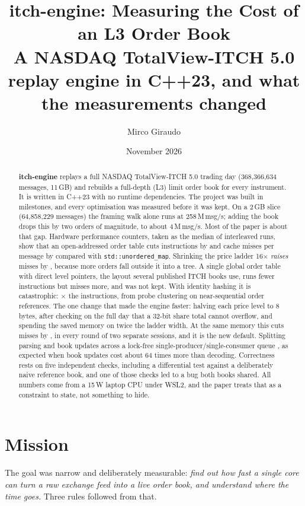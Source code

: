 \documentclass[10pt,a4paper]{article}
\title{\textbf{itch-engine}: Measuring the Cost of an L3 Order Book\\[2pt]
\large A NASDAQ TotalView-ITCH 5.0 replay engine in C++23, and what the measurements changed}
\author{Mirco Giraudo}
\date{November 2026}
\newcommand{\code}[1]{\texttt{#1}}
\begin{document}
\maketitle

\begin{abstract}
\noindent
\textbf{itch-engine} replays a full NASDAQ TotalView-ITCH 5.0 trading day (368{,}366{,}634 messages, 11\,GB)
and rebuilds a full-depth (L3) limit order book for every instrument. It is written in C++23 with no runtime dependencies.
The project was built in milestones, and every optimisation was measured before it was kept.
On a 2\,GB slice (64{,}858{,}229 messages) the framing walk alone runs at 258\,M\,msg/s;
adding the book drops this by two orders of magnitude, to about 4\,M\,msg/s. Most of the paper is about that gap.
Hardware performance counters, taken as the median of \CountersReps{} interleaved runs, show that an open-addressed order table cuts instructions by \PctTableInstr{} and
cache misses per message by \PctTableMiss{} compared with \code{std::unordered\_map}.
Shrinking the price ladder 16$\times$ \emph{raises} misses by \PctWidthMiss, because more orders fall outside it into a tree.
A single global order table with direct level pointers, the layout several published ITCH books use, runs fewer instructions
but misses more, and was not kept. With identity hashing it is catastrophic: \GidInstrX$\times$ the instructions, from probe clustering on near-sequential order references.
The one change that made the engine faster: halving each price level to 8 bytes, after checking on the full day that a 32-bit share total cannot overflow,
and spending the saved memory on twice the ladder width. At the same memory this cuts misses by \PctLevelWideMiss, in every round of two separate sessions, and it is the new default.
Splitting parsing and book updates across a lock-free single-producer/single-consumer queue
\MthreeVerdictShort, as expected when book updates cost about 64 times more than decoding.
Correctness rests on five independent checks, including a differential test against a deliberately naive reference
book, and one of those checks led to a bug both books shared.
All numbers come from a 15\,W laptop CPU under WSL2, and the paper treats that as a constraint to state, not something to hide.
\end{abstract}

\section{Mission}
The goal was narrow and deliberately measurable: \emph{find out how fast a single core can turn
a raw exchange feed into a live order book, and understand where the time goes.}
Three rules followed from that.
\end{document}
